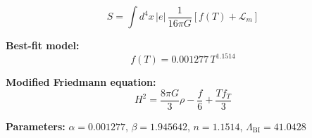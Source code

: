 
\begin{equation}
  S = \int d^4x \, |e| \, \frac{1}{16\pi G} \left[ f(T) + \mathcal{L}_m \right]
\end{equation}

\textbf{Best-fit model:}
\begin{equation}
  f(T) = 0.001277 \, T^{1.1514}
\end{equation}

\textbf{Modified Friedmann equation:}
\begin{equation}
  H^2 = \frac{8\pi G}{3} \rho - \frac{f}{6} + \frac{T f_T}{3}
\end{equation}

\textbf{Parameters:}
$\alpha = 0.001277$, \quad
$\beta = 1.945642$, \quad
$n = 1.1514$, \quad
$\Lambda_{\text{BI}} = 41.0428$